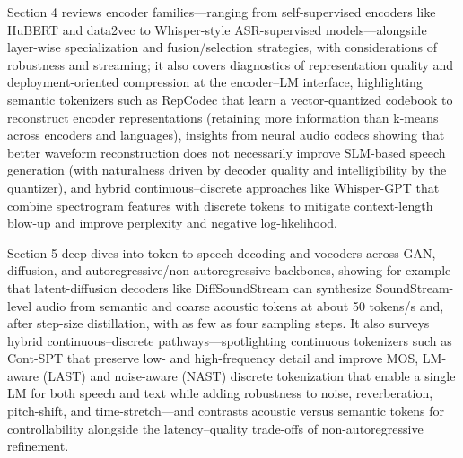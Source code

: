 \documentclass{article}
\begin{document}
Section 4 reviews encoder families---ranging from self-supervised encoders like HuBERT and data2vec to Whisper-style ASR-supervised models---alongside layer-wise specialization and fusion/selection strategies, with considerations of robustness and streaming; it also covers diagnostics of representation quality and deployment-oriented compression at the encoder--LM interface, highlighting semantic tokenizers such as RepCodec that learn a vector-quantized codebook to reconstruct encoder representations (retaining more information than k-means across encoders and languages), insights from neural audio codecs showing that better waveform reconstruction does not necessarily improve SLM-based speech generation (with naturalness driven by decoder quality and intelligibility by the quantizer), and hybrid continuous--discrete approaches like Whisper-GPT that combine spectrogram features with discrete tokens to mitigate context-length blow-up and improve perplexity and negative log-likelihood. \cite{verma2024whispergpthybridrepresentationaudiolarge,li2024investigatingneuralaudiocodecsspeechlang,huang2024repcodecspeechrepresentationcodectokeniz} 



Section 5 deep-dives into token-to-speech decoding and vocoders across GAN, diffusion, and autoregressive/non-autoregressive backbones, showing for example that latent-diffusion decoders like DiffSoundStream can synthesize SoundStream-level audio from semantic and coarse acoustic tokens at about 50 tokens/s and, after step-size distillation, with as few as four sampling steps. It also surveys hybrid continuous--discrete pathways---spotlighting continuous tokenizers such as Cont-SPT that preserve low- and high-frequency detail and improve MOS, LM-aware (LAST) and noise-aware (NAST) discrete tokenization that enable a single LM for both speech and text while adding robustness to noise, reverberation, pitch-shift, and time-stretch---and contrasts acoustic versus semantic tokens for controllability alongside the latency--quality trade-offs of non-autoregressive refinement. \cite{li2025continuousspeechtokenizertext,turetzky2024lastlanguagemodelawarespeechtokenization,yang2025diffsoundstreamefficientspeechtokenizati,messica2024nastnoiseawarespeechtokenizationlanguage,guo2025recentadvancesdiscretespeechtokensreview} 
\end{document}
